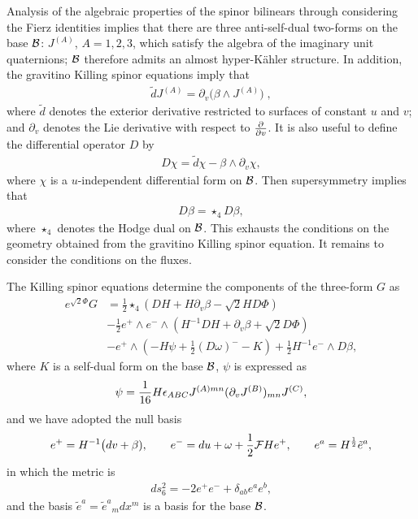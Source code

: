 Analysis of the algebraic properties of the spinor bilinears through considering the Fierz identities implies that there are three anti-self-dual two-forms on the base ${\cal{B}}$: $J^{(A)}$, $A=1,2,3$, which
satisfy the algebra of the imaginary unit quaternions; ${\cal{B}}$ therefore admits an almost hyper-K\"ahler structure. In addition, the
gravitino Killing spinor equations imply that
\begin{eqnarray}
\label{almosthk}
{\tilde{d}} J^{(A)} = \partial_v \bigg( \beta \wedge J^{(A)} \bigg) \; ,
\end{eqnarray}
where ${\tilde{d}}$ denotes the exterior derivative restricted to surfaces of constant $u$ and $v$;
and $\partial_v$ denotes the Lie derivative with respect to ${\partial \over \partial v}$.
It is also useful to define the differential operator $D$ by
\begin{eqnarray}
D \chi = {\tilde{d}} \chi - \beta \wedge \partial_v \chi,
\end{eqnarray}
where $\chi$ is a $u$-independent differential form on ${\cal{B}}$.
Then supersymmetry implies that
\begin{eqnarray}
D \beta = \star_4 D \beta,
\end{eqnarray}
where $\star_4$ denotes the Hodge dual on ${\cal{B}}$. This exhausts the conditions on the
geometry obtained from the gravitino Killing spinor equation. It remains to consider
the conditions on the fluxes.

The Killing spinor equations determine the components of the three-form $G$ as
\begin{equation}
\begin{aligned}
    e^{\sqrt{2} \Phi } G &= \tfrac{1}{2} \star_4 \left(DH + H \partial_v \beta - \sqrt{2} H D \Phi \right) \\
    &- \tfrac{1}{2} e^+ \wedge e^- \wedge \left(H^{-1} DH + \partial_v \beta + \sqrt{2} D \Phi \right) \\
    &- e^+ \wedge (-H \psi + \tfrac{1}{2} (D\omega)^- -K) + \tfrac{1}{2} H^{-1} e^-\wedge D \beta,
\end{aligned}
\label{susythree}
\end{equation}
where $K$ is a self-dual form on the base ${\cal{B}}$, $\psi$ is expressed as
\begin{eqnarray}
\psi = {1 \over 16} H \epsilon_{ABC} J^{(A) mn} (\partial_v J^{(B)})_{mn} J^{(C)},
\label{psidef}
\end{eqnarray}
and we have adopted the null basis
\begin{eqnarray}
e^+ = H^{-1} \big(dv+\beta), \qquad e^-= du+\omega +{1 \over 2} {\cal{F}} H e^+, \qquad
e^a= H^{1 \over 2} {\tilde{e}}^a,
\end{eqnarray}
in which the metric is
\begin{eqnarray}
ds^2_6 =-2 e^+ e^- + \delta_{ab} e^a e^b,
\end{eqnarray}
and the basis ${\tilde{e}}^a= {\tilde{e}}^a{}_m dx^m$ is a basis for the base ${\cal{B}}$.

